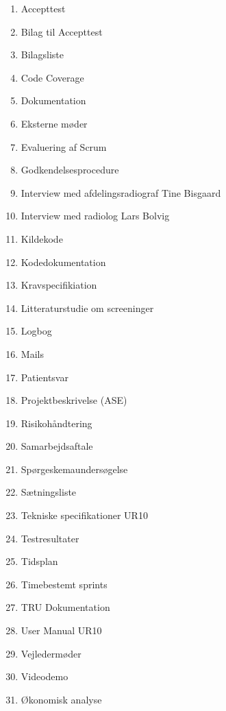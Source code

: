 \begin{enumerate}
\item Accepttest 					 					\label{Accepttest}
\item Bilag til Accepttest								\label{BilagAccepttest}
\item Bilagsliste								\label{Bilagsliste}
\item Code Coverage 									\label{Code Coverage}
\item Dokumentation 							\label{Udviklingsdokument}
\item Eksterne møder									\label{Eksterne moder} 
\item Evaluering af Scrum 								\label{Evaluering Scrum} 
\item Godkendelsesprocedure 							\label{Godkendelsesprocedure}
\item Interview med afdelingsradiograf Tine Bisgaard 	\label{Tine}
\item Interview med radiolog Lars Bolvig  				\label{Telefoninterview}
\item Kildekode											\label{Kildekode}
\item Kodedokumentation 								\label{Kodedokumentation} 
\item Kravspecifikiation 								\label{Kravspecifikation}
\item Litteraturstudie om screeninger						\label{Litteraturstudie}
\item Logbog											\label{Logbog}
\item Mails												\label{Mails}
\item Patientsvar										\label{Patientsvar} 
\item Projektbeskrivelse (ASE) 							\label{Projektbeskrivelse}
\item Risikohåndtering 									\label{Risikohandtering} 
\item Samarbejdsaftale									\label{Samarbejdsaftale} 
\item Spørgeskemaundersøgelse 							\label{Sporgeskemaundersogelse}
\item Sætningsliste 									\label{Satningsliste}
\item Tekniske specifikationer UR10						\label{UR10spec}
\item Testresultater 									\label{TestResultater}
\item Tidsplan											\label{Tidsplan}
\item Timebestemt sprints 								\label{Timebestemt sprints}
\item TRU Dokumentation 								\label{TRUDokumentation}
\item User Manual UR10 									\label{UserManualUR10}
\item Vejledermøder										\label{Vejledermoder}
\item Videodemo
\label{Videodemo}
\item Økonomisk analyse					\label{Okonomi}
\end{enumerate}



